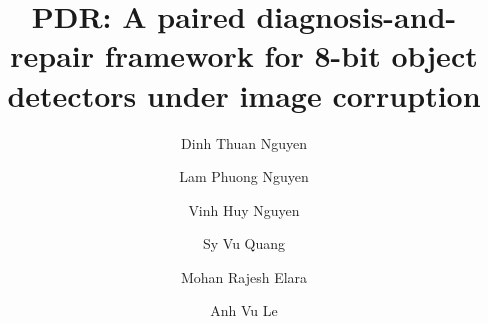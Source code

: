 \documentclass[a4paper,fleqn]{cas-dc}
\def\corref#1{}%
\def\orcidlink#1{}%
\begin{document}
\begin{titlepage}

\title[mode=title]{PDR: A paired diagnosis-and-repair framework for 8-bit object detectors under image corruption}
\author[mymainaddress]{Dinh Thuan Nguyen\orcidlink{0009-0008-6467-203X}}
\author[mymainaddress]{Lam Phuong Nguyen\orcidlink{0009-0007-3439-5871}}
\author[mysecondaryaddress]{Vinh Huy Nguyen\orcidlink{0009-0006-0878-9714}}
\author[mythirdaddress]{Sy Vu Quang}
\author[fourthaddress]{Mohan Rajesh Elara\orcidlink{0000-0001-6504-1530}}
\author[mythirdaddress]{Anh Vu Le\orcidlink{0000-0002-4804-7540}\corref{mycorrespondingauthor}}

\address[mymainaddress]{Faculty of Electrical and Electronics Engineering, Ton Duc Thang University, Ho Chi Minh City, Vietnam}
\address[mysecondaryaddress]{Center of Visualization and Simulation, Duy Tan University, Da Nang, Vietnam}
\address[mythirdaddress]{Advanced Intelligent Technology Research Group, Faculty of Electrical and Electronics Engineering, Ton Duc Thang University, 19 Nguyen Huu Tho Street, Tan Phong Ward, District 7, Ho Chi Minh City 700000, Vietnam}
\address[fourthaddress]{ROAR Lab, Engineering Product Development, Singapore University of Technology and Design, Singapore}


\end{titlepage}
\end{document}

